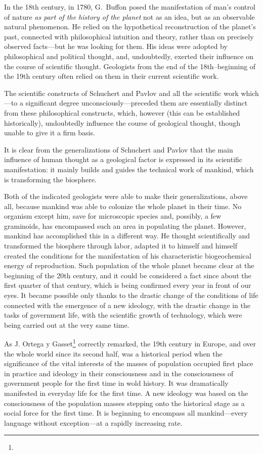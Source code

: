 In the 18th century, in 1780, G.\ Buffon posed the manifestation of man's
control of nature \emph{as part of the history of the planet} not as an idea,
but as an observable natural phenomenon.  He relied on the hypothetical
reconstruction of the planet's past, connected with philosophical intuition and
theory, rather than on precisely observed facts---but he was looking for them.
His ideas were adopted by philosophical and political thought, and,
undoubtedly, exerted their influence on the course of scientific thought.
Geologists from the end of the 18th--beginning of the 19th century often relied
on them in their current scientific work.


\Section %
The scientific constructs of Schuchert and Pavlov and all the scientific
work which---to a significant degree unconsciously---preceded them are
essentially distinct from these philosophical constructs, which, however (this
can be established historically), undoubtedly influence the course of
geological thought, though unable to give it a firm basis.

It is clear from the generalizations of Schuchert and Pavlov that the main
influence of human thought as a geological factor is expressed in its
scientific manifestation: it mainly builds and guides the technical work of
mankind, which is transforming the biosphere.

Both of the indicated geologists were able to make their generalizations,
above all, because mankind was able to colonize the whole planet in their
time.  No organism except him, save for microscopic species and, possibly, a
few graminoids, has encompassed such an area in populating the planet.
However, mankind has accomplished this in a different way.  He thought
scientifically and transformed the biosphere through labor, adapted it to
himself and himself created the conditions for the manifestation of his
characteristic biogeochemical energy of reproduction.  Such population of the
whole planet became clear at the beginning of the 20th century, and it could
be considered a fact since about the first quarter of that century, which is
being confirmed every year in front of our eyes.  It became possible only
thanks to the drastic change of the conditions of life connected with the
emergence of a new ideology, with the drastic change in the tasks of
government life, with the scientific growth of technology, which were being
carried out at the very same time.

As J. Ortega y Gasset\footnote{}
correctly remarked, the 19th century in Europe, and over the whole world since
its second half, was a historical period when the significance of the vital
interests of the masses of population occupied first place in practice and
ideology in their consciousness and in the consciousness of government people
for the first time in wold history.  It was dramatically manifested in everyday
life for the first time.  A new ideology was based on the consciousness of the
population masses stepping onto the historical stage as a social force for the
first time.  It is beginning to encompass all mankind---every language without
exception---at a rapidly increasing rate.

